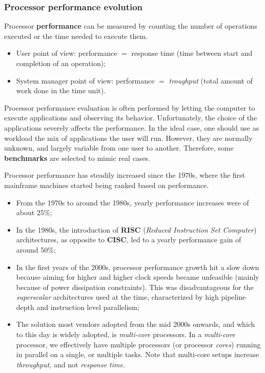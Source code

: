 \documentclass[a4paper,11pt]{article}
\begin{document}
\subsubsection{Processor performance evolution}

Processor \textbf{performance} can be measured by counting the number of operations executed or the time needed to execute them.
\begin{itemize}
	\item User point of view: performance $=$ response time (time between start and completion of an operation);
	\item System manager point of view: performance $=$ \textit{troughput} (total amount of work done in the time unit).
\end{itemize}

Processor performance evaluation is often performed by letting the computer to execute
applications and observing its behavior.
Unfortunately, the choice of the applications severely
affects the performance.
In the ideal case, one should use as workload the mix of
applications the user will run.
However, they are normally unknown, and largely
variable from one user to another.
Therefore, some \textbf{benchmarks} are selected to mimic real
cases.

Processor performance has steadily increased since the 1970s, where the first mainframe machines started being ranked based on performance.

\begin{itemize}
	\item From the 1970s to around the 1980s, yearly performance increases were of about 25\%;
	\item In the 1980s, the introduction of \textbf{RISC} (\textit{Reduced Instruction Set Computer}) architectures, as opposite to \textbf{CISC}, led to a yearly performance gain of around 50\%;
	\item In the first years of the 2000s, processor performance growth hit a slow down because aiming for higher and higher clock speeds became unfeasible (mainly because of power dissipation constraints). This was disadvantageous for the \textit{superscalar} architectures used at the time, characterized by high pipeline depth and instruction level parallelism;
	\item The solution most vendors adopted from the mid 2000s onwards, and which to this day is widely adopted, is \textit{multi-core} processors. In a \textit{multi-core} processor, we effectively have multiple processors (or processor \textit{cores}) running in parallel on a single, or multiple tasks. Note that multi-core setups increase \textit{throughput}, and not \textit{response time}.
\end{itemize}
\end{document}
